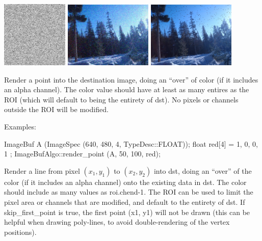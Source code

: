 \noindent
\includegraphics[width=1.25in]{figures/unifnoise1.jpg}
\spc \includegraphics[width=1.65in]{figures/tahoe-gauss.jpg} 
\spc \includegraphics[width=1.65in]{figures/tahoe-pepper.jpg}

\apiend


 
Render a point into the destination image,  doing an ``over'' of color (if
it includes an alpha channel). The {\cf color} value should have at least as
many entires as the ROI (which will default to being the entirety of
{\cf dst}). No pixels or channels outside the ROI will be modified.

\smallskip
\noindent Examples:
\begin{code}
    ImageBuf A (ImageSpec (640, 480, 4, TypeDesc::FLOAT));
    float red[4] = { 1, 0, 0, 1 };
    ImageBufAlgo::render_point (A, 50, 100, red);
\end{code}
\apiend


 
Render a line from pixel $(x_1,y_1)$ to $(x_2,y_2)$ into {\cf dst}, doing an
``over'' of the color (if it includes an alpha channel) onto the existing
data in {\cf dst}. The {\cf color} should include as many values as {\cf
roi.chend-1}. The ROI can be used to limit the pixel area or channels that
are modified, and default to the entirety of {\cf dst}. If {\cf skip_first_point}
is {\cf true}, the first point {\cf (x1, y1)} will not be drawn (this can
be helpful when drawing poly-lines, to avoid double-rendering of the
vertex positions).

